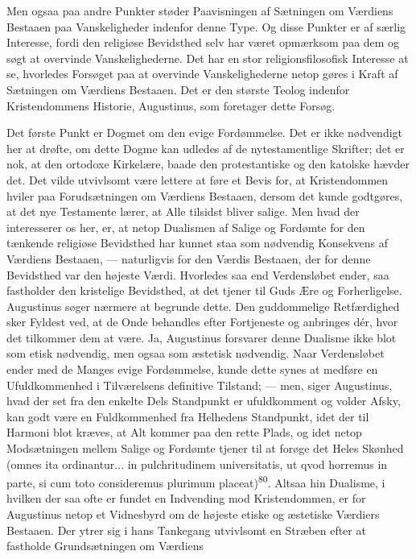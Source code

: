 \documentclass[12pt,a4paper,openany]{book}
\newcommand{\opage}[1]{\marginnote{\footnotesize\textit{[#1]}}}
\begin{document}
Men ogsaa paa andre Punkter støder Paavisningen af Sætningen om Værdiens
Bestaaen paa Vanskeligheder indenfor denne Type. Og disse Punkter er af
særlig Interesse, fordi den religiøse Bevidsthed selv har været
opmærksom paa dem og søgt at overvinde Vanskelighederne. Det har en stor
religionsfilosofisk Interesse at se, hvorledes Forsøget paa at overvinde
Vanskelighederne netop gøres i Kraft af Sætningen om Værdiens Bestaaen.
Det er den største Teolog indenfor Kristendommens Historie, Augustinus,
som foretager dette Forsøg.

Det første Punkt er Dogmet om den evige Fordømmelse. Det er ikke
nødvendigt her at drøfte, om dette Dogme kan udledes af de
nytestamentlige Skrifter; det er nok, at den ortodoxe Kirkelære, baade
den protestantiske og den katolske hævder det. Det vilde utvivlsomt være
lettere at føre et Bevis for, at Kristendommen hviler paa Forudsætningen
om Værdiens Bestaaen, dersom det kunde godtgøres, at det nye Testamente
lærer, at Alle tilsidst bliver salige. Men hvad der interesserer os her,
er, at netop Dualismen af Salige og Fordømte for den tænkende religiøse
Bevidsthed har kunnet staa som nødvendig Konsekvens af Værdiens
Bestaaen, --- naturligvis for den Værdis Bestaaen, der for denne
Bevidsthed var den højeste Værdi. Hvorledes saa end Verdensløbet ender,
saa fastholder den kristelige Bevidsthed, at det tjener til Guds Ære og
Forherligelse. Augustinus søger nærmere at begrunde dette. Den
guddommelige Retfærdighed sker Fyldest ved, at de Onde behandles efter
Fortjeneste og anbringes dér, hvor
\opage{161}det tilkommer dem at være. Ja, Augustinus forsvarer denne
Dualisme ikke blot som etisk nødvendig, men ogsaa som æstetisk
nødvendig. Naar Verdensløbet ender med de Manges evige Fordømmelse,
kunde dette synes at medføre en Ufuldkommenhed i Tilværelsens definitive
Tilstand; --- men, siger Augustinus, hvad der set fra den enkelte Dels
Standpunkt er ufuldkomment og volder Afsky, kan godt være en
Fuldkommenhed fra Helhedens Standpunkt, idet der til Harmoni blot
kræves, at Alt kommer paa den rette Plads, og idet netop Modsætningen
mellem Salige og Fordømte tjener til at forøge det Heles Skønhed (omnes
ita ordinantur... in pulchritudinem universitatis, ut qvod horremus in
parte, si cum toto consideremus plurimum placeat)\textsuperscript{80}.
Altsaa hin Dualisme, i hvilken der saa ofte er fundet en Indvending mod
Kristendommen, er for Augustinus netop et Vidnesbyrd om de højeste
etiske og æstetiske Værdiers Bestaaen. Der ytrer sig i hans Tankegang
utvivlsomt en Stræben efter at fastholde Grundsætningen om Værdiens
\end{document}
